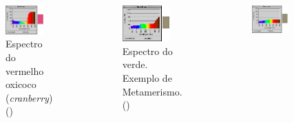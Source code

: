 \begin{frame}[allowframebreaks]
  \begin{columns}[T]
    \begin{figure}[h!]
    \centering
    \includegraphics[width=0.8\textwidth]{images/spd_red.jpg}
    \caption{Espectro do vermelho oxicoco (\textit{cranberry}) ()}
    \label{fig:spd_red}
    \end{figure}
    \begin{figure}[h!]
    \centering
    \includegraphics[width=0.8\textwidth]{images/spd_green1.jpg}
    \caption{Espectro do verde. Exemplo de Metamerismo. ()}
    \label{fig:spd_green1}
    \end{figure}
    \begin{figure}[h!]
    \centering
    \includegraphics[width=0.8\textwidth]{images/spd_green2.jpg}

\end{figure}
\end{columns}
\end{frame}
